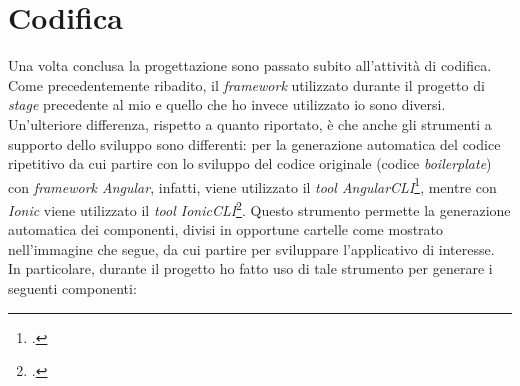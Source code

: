 
\section{Codifica}

Una volta conclusa la progettazione sono passato subito all'attività di codifica. Come precedentemente ribadito, il \textit{framework} utilizzato durante il progetto di \textit{stage} precedente al mio e quello che ho invece utilizzato io sono diversi. Un'ulteriore differenza, rispetto a quanto riportato, è che anche gli strumenti a supporto dello sviluppo sono differenti: per la generazione automatica del codice ripetitivo da cui partire con lo sviluppo del codice originale (codice \textit{boilerplate}) con \textit{framework Angular}, infatti, viene utilizzato il \textit{tool AngularCLI}\footcite{tec:angularcli}, mentre con \textit{Ionic} viene utilizzato il \textit{tool IonicCLI}\footcite{tec:ioniccli}. Questo strumento permette la generazione automatica dei componenti, divisi in opportune cartelle come mostrato nell'immagine che segue, da cui partire per sviluppare l'applicativo di interesse. In particolare, durante il progetto ho fatto uso di tale strumento per generare i seguenti componenti:
